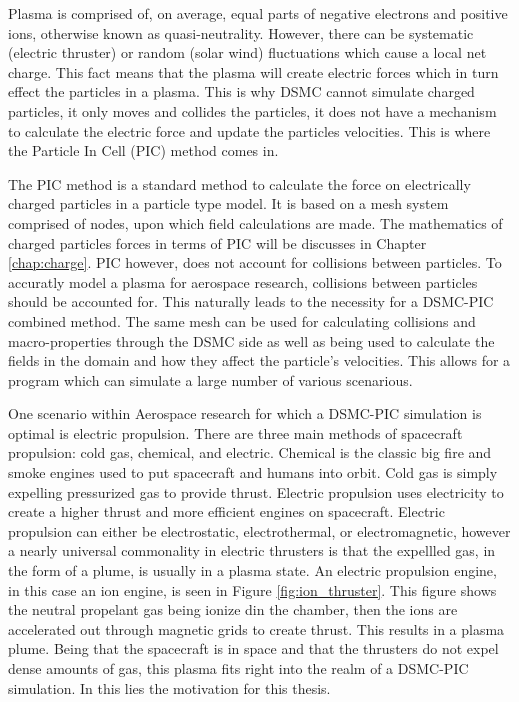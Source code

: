 \indent Plasma is comprised of, on average, equal parts of negative electrons and positive ions, otherwise known as quasi-neutrality. However, there can be systematic (electric thruster) or random (solar wind) fluctuations which cause a local net charge. This fact means that the plasma will create electric forces which in turn effect the particles in a plasma. This is why DSMC cannot simulate charged particles, it only moves and collides the particles, it does not have a mechanism to calculate the electric force and update the particles velocities. This is where the Particle In Cell (PIC) method comes in. \par

\indent The PIC method is a standard method to calculate the force on electrically charged particles in a particle type model. It is based on a mesh system comprised of nodes, upon which field calculations are made. The mathematics of charged particles forces in terms of PIC will be discusses in Chapter \ref{chap:charge}. PIC however, does not account for collisions between particles. To accuratly model a plasma for aerospace research, collisions between particles should be accounted for. This naturally leads to the necessity for a DSMC-PIC combined method. The same mesh can be used for calculating collisions and macro-properties through the DSMC side as well as being used to calculate the fields in the domain and how they affect the particle's velocities. This allows for a program which can simulate a large number of various scenarious. \par


\indent One scenario within Aerospace research for which a DSMC-PIC simulation is optimal is electric propulsion. There are three main methods of spacecraft propulsion: cold gas, chemical, and electric. Chemical is the classic big fire and smoke engines used to put spacecraft and humans into orbit. Cold gas is simply expelling pressurized gas to provide thrust. Electric propulsion uses electricity to create a higher thrust and more efficient engines on spacecraft. Electric propulsion can either be electrostatic, electrothermal, or electromagnetic, however a nearly universal commonality in electric thrusters is that the expellled gas, in the form of a plume, is usually in a plasma state. An electric propulsion engine, in this case an ion engine, is seen in Figure \ref{fig:ion_thruster}. This figure shows the neutral propelant gas being ionize din the chamber, then the ions are accelerated out through magnetic grids to create thrust. This results in a plasma plume. Being that the spacecraft is in space and that the thrusters do not expel dense amounts of gas, this plasma fits right into the realm of a DSMC-PIC simulation. In this lies the motivation for this thesis. \par


